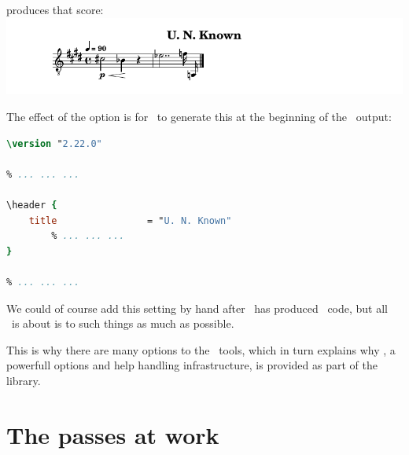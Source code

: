 produces that score:\\
\includegraphics[scale=0.7]{../graphics/MinimalScoreWithAnotherTitle.png}

The effect of the  option is for \xmlToLy\ to generate this at the beginning of the \lily\ output:
\begin{lstlisting}[language=Lilypond]
\version "2.22.0"

% ... ... ...

\header {
    title                = "U. N. Known"
		% ... ... ...
}

% ... ... ...
\end{lstlisting}

We could of course add this  setting by hand after \xmlToLy\ has produced \lily\ code, but all \mf\ is about is to  such things as much as possible.

This is why there are  many options to the \mf\ tools, which in turn explains why \oahRepr, a powerfull options and help handling infrastructure, is provided as part of the library.


\section{The passes at work}

